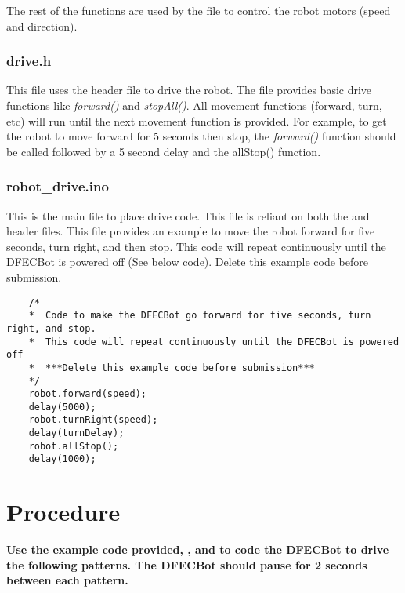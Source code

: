 \documentclass{handout}
\begin{document}
	The rest of the functions are used by the  file to control the robot motors (speed and direction).
	
	\subsubsection{drive.h}
	This file uses the  header file to drive the robot. The  file provides basic drive functions like \textit{forward()} and \textit{stopAll()}. All movement functions (forward, turn, etc) will run until the next movement function is provided. For example, to get the robot to move forward for 5 seconds then stop, the \textit{forward()} function should be called followed by a 5 second delay and the allStop() function.
	
	\subsubsection{robot\_drive.ino}
	This is the main file to place drive code. This file is reliant on both the  and  header files. This file provides an example to move the robot forward for five seconds, turn right, and then stop. This code will repeat continuously until the DFECBot is powered off (See below code). Delete this example code before submission.
	
	\begin{lstlisting}
	/* 
	*  Code to make the DFECBot go forward for five seconds, turn right, and stop.
	*  This code will repeat continuously until the DFECBot is powered off
	*  ***Delete this example code before submission***
	*/
	robot.forward(speed);
	delay(5000);
	robot.turnRight(speed);
	delay(turnDelay);
	robot.allStop();
	delay(1000);
	\end{lstlisting}
	
	\newpage
	\clearpage
	\pagebreak
	
	\section{Procedure}
	\textbf{Use the example code provided, , and  to code the DFECBot to drive the following patterns. The DFECBot should pause for 2 seconds between each pattern.}
		
\end{document}
